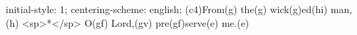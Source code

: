 initial-style: 1;
centering-scheme: english;
(c4)From(g) the(g) wick(g)ed(hi) man,(h) <sp>*</sp> O(gf) Lord,(gv) pre(gf)serve(e) me.(e)
